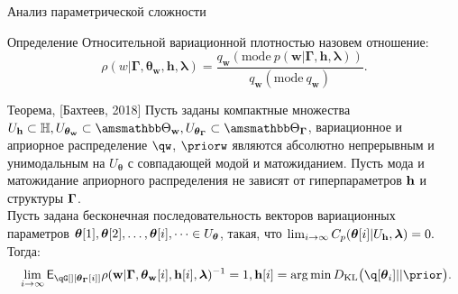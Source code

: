 \documentclass[usenames,dvipsnames,11pt,pdf,utf8,russian,aspectratio=43]{beamer}
\DeclareMathOperator*{\argmin}{arg\,min}
\begin{document}
\begin{frame}{Анализ параметрической сложности}


\vspace{-0.2cm} 
\begin{block}{Определение}
Относительной вариационной   плотностью  назовем отношение:
\[
\rho(w|\boldsymbol{\Gamma},\boldsymbol{\theta}_\mathbf{w}, \mathbf{h},\boldsymbol{\lambda})=\frac{q_\mathbf{w}(\text{mode}~p(\mathbf{w}|\boldsymbol{\Gamma}, \mathbf{h}, \boldsymbol{\lambda}))}{q_\mathbf{w}(\text{mode}~{q_\mathbf{w}})}.
\]
\end{block}


\begin{block}{Теорема, [Бахтеев, 2018]}
Пусть заданы компактные множества $\Uh \subset \Hb, \Utetaw \subset \Tetawb, \UtetaG \subset \TetaGb$,
вариационное и априорное распределение $\qw$, $\priorw$  являются абсолютно непрерывным и унимодальным на  $U_{\boldsymbol{\theta}}$ с совпадающей модой и матожиданием.
Пусть  мода и матожидание априорного распределения не зависят от гиперпараметров $\mathbf{h}$  и структуры $\boldsymbol{\Gamma}$.\\
Пусть задана  бесконечная последовательность векторов вариационных параметров $\boldsymbol{\theta}[1],\boldsymbol{\theta}[2],\dots,\boldsymbol{\theta}[i],\dots \in U_{\boldsymbol{\theta}}$, такая, что $\lim_{i \to \infty}C_p(\boldsymbol{\theta}[i]|U_{\mathbf{h}},\boldsymbol{\lambda}) = 0.$
Тогда:
\footnotesize
$$
   \lim_{i \to \infty} \E_{\qG[][{\tetaG[i]}]} {\rho}(\w|\Gam, {\tetaw[i]}, {\h[i]}, \lam)^{-1} = 1, \h[i] = \argmin \KL{\q[\teta_i]}{\prior}.
$$
\end{block}


\end{frame}
\end{document}

